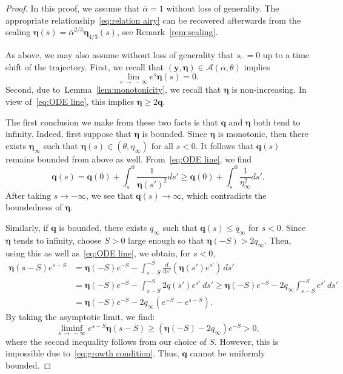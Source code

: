 \documentclass[AHL,Unicode,longabstracts]{cedram}
\newcommand{\bq}{\mathbf{q}}
\newcommand{\by}{\mathbf{y}}
\newcommand{\bA}{\mathscr{A}}
\newcommand{\beeta}{\boldsymbol{\eta}}
\newcommand{\1}{\mathds{1}}
\newcommand{\shh}{s_{\vdash}}
\begin{document}
\begin{proof}
In this proof, we assume that $\overline{\alpha} =1$ without loss of generality. The appropriate relationship~\eqref{eq:relation airy} can be recovered afterwards from the scaling $\beeta(s) = \overline{\alpha}^{2/3} \beeta_{4/3}(s)$, see Remark~\ref{rem:scaling}.

As above, we may also assume without loss of generality that $\shh = 0$ up to a time shift of the trajectory. First, we recall that $(\by,\beeta) \in \bA(\alpha,\theta)$ implies
\begin{equation}\label{eq:growth condition}
\lim_{s\,\to\,-\infty} e^s \beeta(s) = 0.
\end{equation}
Second, due to~Lemma~\ref{lem:monotonicity}, we recall that $\beeta$ is non-increasing. In view of~\eqref{eq:ODE line}, this implies $\beeta \geq 2\bq$.

The first conclusion we make from these two facts is that $\bq$ and $\beeta$ both tend to infinity. Indeed, first suppose that $\beeta$ is bounded. Since $\beeta$ is monotonic, then there exists $\beeta_\infty$ such that $\beeta(s) \in (\theta, \eta_\infty)$ for all $s<0$. It follows that $\bq(s)$ remains bounded from above as well. From~\eqref{eq:ODE line}, we find
\[
\bq(s) = \bq(0) + \int_s^0 \frac{1}{\beeta(s')^2}ds'
\geq \bq(0) + \int_s^0 \frac{1}{\eta_\infty^2} ds'.
\]
After taking $s\to-\infty$, we see that $\bq(s) \to \infty$, which contradicts the boundedness of $\beeta$.

Similarly, if $\bq$ is bounded, there exists $q_\infty$ such that $\bq(s) \leq q_\infty$ for $s<0$. Since $\beeta$ tends to infinity, choose $S>0$ large enough so that $\beeta(-S) > 2q_\infty$. Then, using this as well as~\eqref{eq:ODE line}, we obtain, for $s<0$,
\begin{align*}
\beeta(s-S)e^{s-S}
&= \beeta(-S)e^{-S}-\int_{s-S}^{-S} \frac d{ds'}\left (\beeta(s')e^{s'}\right)\, ds'\\
&= \beeta(-S)e^{-S}-\int_{s-S}^{-S} 2q(s') e^{s'} \, ds'
\geq \beeta(-S)e^{-S} -2q_\infty \int_{s-S}^{-S} e^{s'} \, ds'\\
&= \beeta(-S)e^{-S} -2q_\infty\left(e^{-S}-e^{s-S}\right).
\end{align*}
By taking the asymptotic limit, we find:
\[
\liminf_{s\,\rightarrow\,-\infty} e^{s-S} \beeta(s-S) \geq \left(\beeta(-S) -2q_\infty\right)e^{-S} >0,
\]
where the second inequality follows from our choice of $S$. However, this is impossible due to~\eqref{eq:growth condition}. Thus, $\bq$ cannot be uniformly bounded.


\end{proof}
\end{document}
